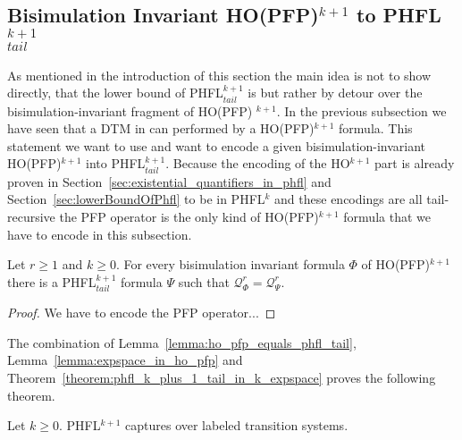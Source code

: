 \subsection{Bisimulation Invariant HO(PFP)$^{k+1}$ to PHFL$^{k+1}_{tail}$}\label{subsec:bisimulationInvariantHopfptoPhfl}

As mentioned in the introduction of this section the main idea is not to show directly, that the lower bound of
PHFL$^{k+1}_{tail}$ is  but rather by detour over the bisimulation-invariant fragment of HO(PFP)
$^{k+1}$. In the previous subsection we have seen that a DTM in  can performed by a HO(PFP)$^{k+1}$
formula. This statement we want to use and want to encode a given bisimulation-invariant HO(PFP)$^{k+1}$ into
PHFL$^{k+1}_{tail}$. Because the encoding of the HO$^{k+1}$ part is already proven in
Section~\ref{sec:existential_quantifiers_in_phfl} and Section~\ref{sec:lowerBoundOfPhfl} to be in PHFL$^k$ and these
encodings are all tail-recursive the PFP operator is the only kind of HO(PFP)$^{k+1}$ formula that we have to encode
in this subsection.

\begin{lemma}
    \label{lemma:ho_pfp_equals_phfl_tail}
    Let $r \geq 1$ and $k \geq 0$. For every bisimulation invariant formula $\Phi$ of HO(PFP)$^{k + 1}$ there is a
    PHFL$^{k+1}_{tail}$ formula $\Psi$ such that $\mathcal{Q}_\Phi^r = \mathcal{Q}_\Psi^r$.
\end{lemma}

\begin{proof}
    We have to encode the PFP operator...
\end{proof}

The combination of Lemma~\ref{lemma:ho_pfp_equals_phfl_tail}, Lemma~\ref{lemma:expspace_in_ho_pfp} and
Theorem~\ref{theorem:phfl_k_plus_1_tail_in_k_expspace} proves the following theorem.

\begin{theorem}
    Let $k \geq 0$. PHFL$^{k+1}$ captures  over labeled transition systems.
\end{theorem}
